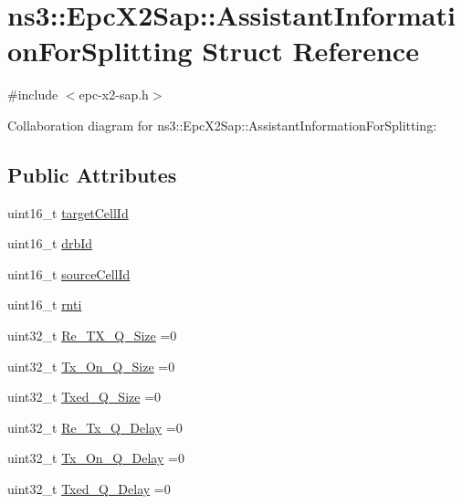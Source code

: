 \hypertarget{structns3_1_1EpcX2Sap_1_1AssistantInformationForSplitting}{}\section{ns3\+:\+:Epc\+X2\+Sap\+:\+:Assistant\+Information\+For\+Splitting Struct Reference}
\label{structns3_1_1EpcX2Sap_1_1AssistantInformationForSplitting}


{\ttfamily \#include $<$epc-\/x2-\/sap.\+h$>$}



Collaboration diagram for ns3\+:\+:Epc\+X2\+Sap\+:\+:Assistant\+Information\+For\+Splitting\+:
\subsection*{Public Attributes}
\begin{DoxyCompactItemize}
\item 
uint16\+\_\+t \hyperlink{structns3_1_1EpcX2Sap_1_1AssistantInformationForSplitting_a4142f8beac438c3a46c6a5e975a65eeb}{target\+Cell\+Id}
\item 
uint16\+\_\+t \hyperlink{structns3_1_1EpcX2Sap_1_1AssistantInformationForSplitting_ab505df9836b9de172f5b19541019d0b9}{drb\+Id}
\item 
uint16\+\_\+t \hyperlink{structns3_1_1EpcX2Sap_1_1AssistantInformationForSplitting_ae866e0673c4705ea8e5d579fdebe7740}{source\+Cell\+Id}
\item 
uint16\+\_\+t \hyperlink{structns3_1_1EpcX2Sap_1_1AssistantInformationForSplitting_aa6f68ddc7b1f92e8c8714303dd1424ba}{rnti}
\item 
uint32\+\_\+t \hyperlink{structns3_1_1EpcX2Sap_1_1AssistantInformationForSplitting_a5b20d980e9d8e3e2d729ed8d401bb044}{Re\+\_\+\+T\+X\+\_\+\+Q\+\_\+\+Size} =0
\item 
uint32\+\_\+t \hyperlink{structns3_1_1EpcX2Sap_1_1AssistantInformationForSplitting_ac76b7b3f85738aeb1d2152a743176428}{Tx\+\_\+\+On\+\_\+\+Q\+\_\+\+Size} =0
\item 
uint32\+\_\+t \hyperlink{structns3_1_1EpcX2Sap_1_1AssistantInformationForSplitting_ac3e1f8f1f070e4caf1afd55a7a2b77d9}{Txed\+\_\+\+Q\+\_\+\+Size} =0
\item 
uint32\+\_\+t \hyperlink{structns3_1_1EpcX2Sap_1_1AssistantInformationForSplitting_a3318691a8790586aed6c45661dbc6402}{Re\+\_\+\+Tx\+\_\+\+Q\+\_\+\+Delay} =0
\item 
uint32\+\_\+t \hyperlink{structns3_1_1EpcX2Sap_1_1AssistantInformationForSplitting_a34ddcaba3cdb96bad2582bd3b1449a77}{Tx\+\_\+\+On\+\_\+\+Q\+\_\+\+Delay} =0
\item 
uint32\+\_\+t \hyperlink{structns3_1_1EpcX2Sap_1_1AssistantInformationForSplitting_aa1ab73d0ac5735b2bf9573220b782199}{Txed\+\_\+\+Q\+\_\+\+Delay} =0
\end{DoxyCompactItemize}


